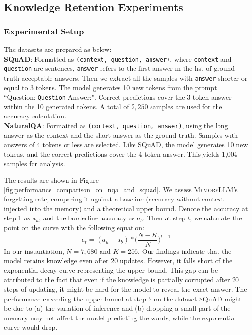 \documentclass{article}
\theoremstyle{plain}
\theoremstyle{definition}
\theoremstyle{remark}
\newcommand{\ours}{\textsc{MemoryLLM}\xspace}
\begin{document}
\vspace{-5pt}
\subsection{Knowledge Retention Experiments}
\label{sub:customized_experiments}

\vspace{-2pt}
\subsubsection{Experimental Setup}
The datasets are prepared as below:\\
\textbf{SQuAD}: Formatted as \texttt{(context, question, answer)}, where \texttt{context} and \texttt{question} are sentences, \texttt{answer} refers to the first answer in the list of ground-truth acceptable answers. Then we extract all the samples with \texttt{answer} shorter or equal to $3$ tokens. The model generates 10 new tokens from the prompt ``Question: \texttt{Question} Answer:". Correct predictions cover the 3-token answer within the 10 generated tokens. A total of $2,250$ samples are used for the accuracy calculation. \\
\textbf{NaturalQA}: Formatted as \texttt{(context, question, answer)}, using the long answer as the context and the short answer as the ground truth. Samples with answers of 4 tokens or less are selected. Like SQuAD, the model generates 10 new tokens, and the correct predictions cover the 4-token answer. This yields 1,004 samples for analysis. 

The results are shown in Figure \ref{fig:performance_comparison_on_nqa_and_squad}. We assess \ours's forgetting rate, comparing it against a baseline (accuracy without context injected into the memory) and a theoretical upper bound. 
Denote the accuracy at step 1 as $a_u$, and the borderline accuracy as $a_b$. Then at step $t$, we calculate the point on the curve with the following equation: 
\begin{equation}
    a_t = (a_u - a_b) * \Big(\frac{N-K}{N}\Big)^{t-1}
\end{equation}
In our instantiation, $N=7,680$ and $K=256$. Our findings indicate that the model retains knowledge even after 20 updates. However, it falls short of the exponential decay curve representing the upper bound. This gap can be attributed to the fact that even if the knowledge is partially corrupted after 20 steps of updating, it might be hard for the model to reveal the exact answer. The performance exceeding the upper bound at step 2 on the dataset SQuAD might be due to (a) the variation of inference and (b) dropping a small part of the memory may not affect the model predicting the words, while the exponential curve would drop.
\end{document}
